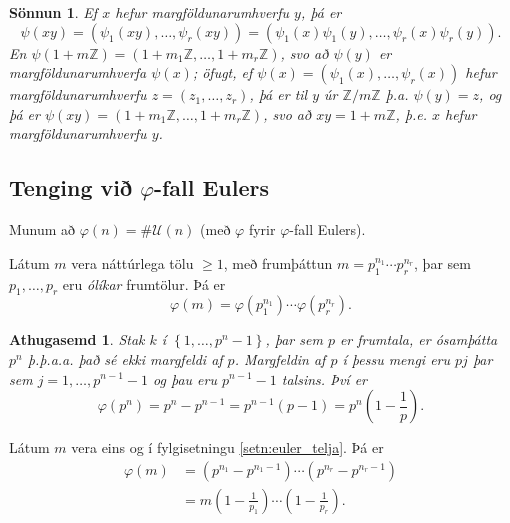 \documentclass[a4paper,icelandic,11pt]{book}
\theoremstyle{plain}
\newtheorem*{ath}{Athugasemd}
\newtheorem*{sonnun}{Sönnun}
\newcommand{\Z}{\mathbb{Z}}
\begin{document}
\begin{sonnun}
  Ef $x$ hefur margföldunarumhverfu $y$, þá er
  \[
  \psi(xy)
  = (\psi_1(xy),\dots,\psi_r(xy))
  = (\psi_1(x)\psi_1(y),\dots,\psi_r(x)\psi_r(y)).
  \]
  En $\psi(1+m\Z) = (1+m_1\Z,\dots,1+m_r\Z)$, svo að $\psi(y)$ er
  margföldunarumhverfa $\psi(x)$; öfugt, ef
  $\psi(x)=(\psi_1(x),\dots,\psi_r(x))$ hefur margföldunarumhverfu
  $z=(z_1,\dots,z_r)$, þá er til $y$ úr $\Z/m\Z$ þ.a. $\psi(y) = z$, og þá er
  $\psi(xy) = (1+m_1\Z,\dots,1+m_r\Z)$, svo að $xy = 1+m\Z$, þ.e. $x$ hefur
  margföldunarumhverfu $y$.
\end{sonnun}

\subsection{Tenging við $\varphi$-fall Eulers}
Munum að $\varphi(n) = \#\mathcal U(n)$ (með $\varphi$ fyrir $\varphi$-fall Eulers).
\begin{fylgisetn}
  \label{setn:euler_telja}
  Látum $m$ vera náttúrlega tölu $\ge 1$, með frumþáttun $m=p_1^{n_1}\cdots
  p_r^{n_r}$, þar sem $p_1,\dots,p_r$ eru \emph{ólíkar} frumtölur. Þá er
  \begin{equation*}
    \varphi(m) = \varphi(p_1^{n_1})\cdots \varphi(p_r^{n_r}).
  \end{equation*}
\end{fylgisetn}
\begin{ath}
  Stak $k$ í $\left\{ 1,\dots,p^{n}-1 \right\}$, þar sem $p$ er frumtala, er
  ósamþátta $p^n$ þ.þ.a.a. það sé ekki margfeldi af $p$. Margfeldin af
  $p$ í þessu mengi eru $pj$ þar sem $j = 1,\dots,p^{n-1}-1$ og þau eru
  $p^{n-1}-1$ talsins.
  Því er
  \begin{equation*}
    \varphi(p^n) = p^n-p^{n-1} = p^{n-1}(p-1) = p^{n}\left(
    1-\frac{1}{p} \right).
  \end{equation*}
\end{ath}
\begin{fylgisetn}
  Látum $m$ vera eins og í fylgisetningu \ref{setn:euler_telja}. Þá er
  \begin{align*}
    \varphi(m)
    &= (p^{n_1} - p^{n_1-1})\cdots (p^{n_r}-p^{n_r-1}) \\
    &= m\left(1-\frac{1}{p_1}\right)\cdots \left( 1-\frac{1}{p_r} \right).
  \end{align*}
\end{fylgisetn}

\end{document}
